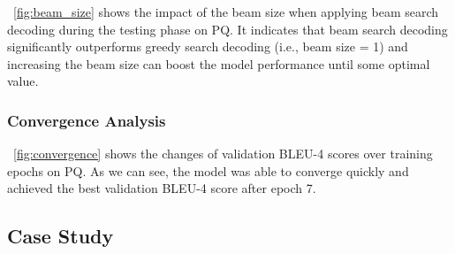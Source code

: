 \documentclass[journal]{IEEEtran}
\begin{document}
~\cref{fig:beam_size} shows the impact of the beam size when applying beam search decoding during the testing phase on PQ. It indicates that beam search decoding significantly outperforms greedy search decoding (i.e., beam size = 1) and increasing the beam size can boost the model performance until some optimal value.





\subsubsection{Convergence Analysis}

~\cref{fig:convergence} shows the changes of validation BLEU-4 scores over training epochs on PQ. As we can see, the model was able to converge quickly and achieved the best validation BLEU-4 score after epoch 7.





\subsection{Case Study}

\begin{table}[!htb]
\vspace{-2mm}
\caption{Generated questions on WQ test set. Target answers are underlined. 
For the sake of brevity, we only display the lowest level of the predicate hierarchy.
}
\label{table:case_study}
\centering
{}

\vspace{-3mm}
\end{table}
\end{document}

